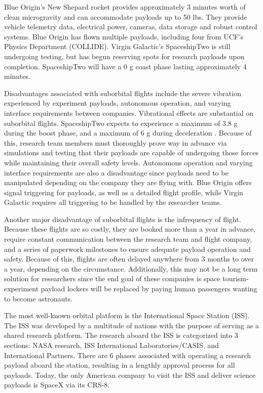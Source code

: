 Blue Origin's New Shepard rocket provides approximately 3 minutes worth of clean microgravity and can accommodate payloads up to 50 lbs. They provide vehicle telemetry data, electrical power, cameras, data storage and robust control systems. Blue Origin has flown multiple payloads, including four from UCF's Physics Department (COLLIDE). Virgin Galactic's SpaceshipTwo is still undergoing testing, but has begun reserving spots for research payloads upon completion. SpaceshipTwo will have a 0 g coast phase lasting approximately 4 minutes.

Disadvantages associated with suborbital flights include the severe vibration experienced by experiment payloads, autonomous operation, and varying interface requirements between companies. Vibrational effects are substantial on suborbital flights. SpaceshipTwo expects to experience a maximum of 3.8 g during the boost phase, and a maximum of 6 g during deceleration \cite{L2}. Because of this, research team members must thoroughly prove way in advance via simulations and testing that their payloads are capable of undergoing those forces while maintaining their overall safety levels. Autonomous operation and varying interface requirements are also a disadvantage since payloads need to be manipulated depending on the company they are flying with. Blue Origin offers signal triggering for payloads, as well as a detailed flight profile, while Virgin Galactic requires all triggering to be handled by the researcher teams.

Another major disadvantage of suborbital flights is the infrequency of flight. Because these flights are so costly, they are booked more than a year in advance, require constant communication between the research team and flight company, and a series of paperwork milestones to ensure adequate payload operation and safety. Because of this, flights are often delayed anywhere from 3 months to over a year, depending on the circumstance. Additionally, this may not be a long term solution for researchers since the end goal of these companies is space tourism- experiment payload lockers will be replaced by paying human passengers wanting to become astronauts.

The most well-known orbital platform is the International Space Station (ISS). The ISS was developed by a multitude of nations with the purpose of serving as a shared research platform. The research aboard the ISS is categorized into 3 sections: NASA research, ISS International Laboratories/CASIS, and International Partners. There are 6 phases associated with operating a research payload aboard the station, resulting in a lengthly approval process for all payloads. Today, the only American company to visit the ISS and deliver science payloads is SpaceX via its CRS-8.

